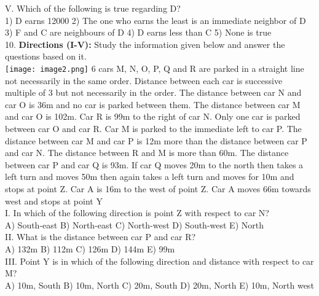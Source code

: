 \documentclass[
]{article}
\begin{document}
V. Which of the following is true regarding D?\\
1) D earns 12000
\hspace{2mm}2) The one who earns the least is an immediate neighbor of D
\hspace{2mm}3) F and C are neighbours of D
\hspace{2mm}4) D earns less than C
\hspace{2mm}5) None is true\\

10. \textbf{Directions (I-V):} Study the information given below and answer the questions based on it.\\
\texttt{[image: image2.png]}
6 cars M, N, O, P, Q and R are parked in a straight line not necessarily in the same order.
Distance between each car is successive multiple of 3 but not necessarily in the order. The
distance between car N and car O is 36m and no car is parked between them. The distance
between car M and car O is 102m. Car R is 99m to the right of car N. Only one car is parked
between car O and car R. Car M is parked to the immediate left to car P. The distance
between car M and car P is 12m more than the distance between car P and car N. The
distance between R and M is more than 60m. The distance between car P and car Q is 93m.
If car Q moves 20m to the north then takes a left turn and moves 50m then again takes a left
turn and moves for 10m and stops at point Z. Car A is 16m to the west of point Z. Car A
moves 66m towards west and stops at point Y\\
I. In which of the following direction is point Z with respect to car N?\\
A) South-east \hspace{2mm}B) North-east \hspace{2mm}C) North-west
\hspace{2mm}D) South-west \hspace{2mm}E) North\\

II. What is the distance between car P and car R?\\
A) 132m \hspace{2mm}B) 112m \hspace{2mm}C) 126m \hspace{2mm}D) 144m \hspace{2mm}E) 99m\\

III. Point Y is in which of the following direction and distance with respect to car M?\\
A) 10m, South \hspace{2mm}B) 10m, North \hspace{2mm}C) 20m, South
\hspace{2mm}D) 20m, North \hspace{2mm}E) 10m, North west\\
\end{document}
